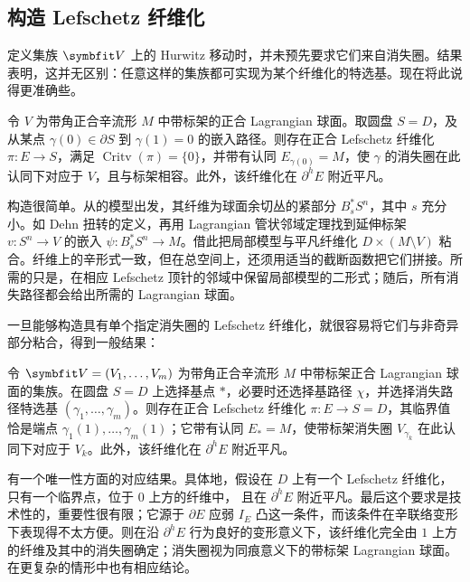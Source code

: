 \subsection{构造 Lefschetz 纤维化}\label{sec:16e}
定义集族 $\symbfit V$ 上的 Hurwitz 移动时，并未预先要求它们来自消失圈。结果表明，这并无区别：任意这样的集族都可实现为某个纤维化的特选基。现在将此说得更准确些。

\clearpage
{}\begin{lemma}\label{st:16.8}
令 $V$ 为带角正合辛流形 $M$ 中带标架的正合 Lagrangian 球面。取圆盘 $S=D$，及从某点 $\gamma(0)\in\partial S$ 到 $\gamma(1)=0$ 的嵌入路径。则存在正合 Lefschetz 纤维化 $\pi:E\to S$，满足 $\operatorname{Critv}(\pi)=\{0\}$，并带有认同 $E_{\gamma(0)}=M$，使 $\gamma$ 的消失圈在此认同下对应于 $V$，且与标架相容。此外，该纤维化在 $\partial^hE$ 附近平凡。
\end{lemma}

构造很简单。从的模型出发，其纤维为球面余切丛的紧部分 $B_s^*S^n$，其中 $s$ 充分小。如 Dehn 扭转的定义，再用 Lagrangian 管状邻域定理找到延伸标架 $v:S^n\to V$ 的嵌入 $\psi:B_s^*S^n\to M$。借此把局部模型与平凡纤维化 $D\times(M\setminus V)$ 粘合。纤维上的辛形式一致，但在总空间上，还须用适当的截断函数把它们拼接。所需的只是，在相应 Lefschetz 顶针的邻域中保留局部模型的二形式；随后，所有消失路径都会给出所需的 Lagrangian 球面。

一旦能够构造具有单个指定消失圈的 Lefschetz 纤维化，就很容易将它们与非奇异部分粘合，得到一般结果：

\begin{lemma}\label{st:16.9}
令 $\symbfit V=(V_1,\ldots,V_m)$ 为带角正合辛流形 $M$ 中带标架正合 Lagrangian 球面的集族。在圆盘 $S=D$ 上选择基点 $*$，必要时还选择基路径 $\chi$，并选择消失路径特选基 $(\gamma_1,\ldots,\gamma_m)$。则存在正合 Lefschetz 纤维化 $\pi:E\to S=D$，其临界值恰是端点 $\gamma_1(1),\ldots,\gamma_m(1)$；它带有认同 $E_*=M$，使带标架消失圈 $V_{\gamma_k}$ 在此认同下对应于 $V_k$。此外，该纤维化在 $\partial^hE$ 附近平凡。
\end{lemma}

有一个唯一性方面的对应结果。具体地，假设在 $D$ 上有一个 Lefschetz 纤维化，只有一个临界点，位于 $0$ 上方的纤维中，
且在 $\partial^hE$ 附近平凡。最后这个要求是技术性的，重要性很有限；它源于 $\partial E$ 应弱 $I_E$ 凸这一条件，而该条件在辛联络变形下表现得不太方便。则在沿 $\partial^hE$ 行为良好的变形意义下，该纤维化完全由 $1$ 上方的纤维及其中的消失圈确定；消失圈视为同痕意义下的带标架 Lagrangian 球面。在更复杂的情形中也有相应结论。

